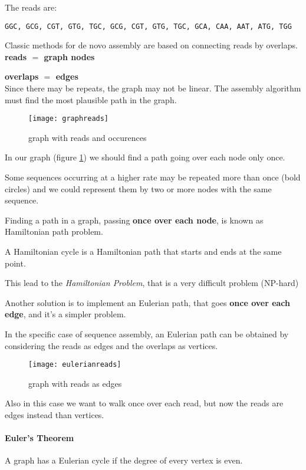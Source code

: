 The reads are:

\texttt{GGC, GCG, CGT, GTG, TGC, GCG, CGT, GTG, TGC, GCA, CAA, AAT, ATG, TGG}

Classic methods for de novo assembly are based on connecting reads by overlaps.\\
 
\textbf{reads $=$ graph nodes}
 
\textbf{overlaps $=$ edges}\\

Since there may be repeats, the graph may not be linear. 
The assembly algorithm must find the most plausible path in the graph.

\begin{figure}[H]
  \centering
  \texttt{[image: graphreads]}
  \caption{graph with reads and occurences}
  \label{fig:graphreads}
\end{figure}

In our graph (figure \ref{fig:graphreads}) we should find a path 
going over each node only once.

Some sequences occurring at a higher rate may be repeated more 
than once (bold circles) and we could represent them by two or more nodes
with the same sequence. 

Finding a path in a graph, passing \textbf{once over each node}, is known as
Hamiltonian path problem.

A Hamiltonian cycle is a Hamiltonian path that starts and ends at the same point.

This lead to the \textit{Hamiltonian Problem}, that is a
very difficult problem (NP-hard)

Another solution is to implement an Eulerian path, that goes
\textbf{once over each edge}, and it's a simpler problem.

In the specific case of sequence assembly, an  Eulerian path can be
obtained by considering the reads as edges and the overlaps as vertices.

\begin{figure}[H]
  \centering
  \texttt{[image: eulerianreads]}
  \caption{graph with reads as edges}
  \label{fig:eulerianreads}
\end{figure}

Also in this case we want to walk once over each read, but 
now the reads are edges instead than vertices.

\paragraph*{Euler's Theorem} A graph has a Eulerian cycle if the degree of every
vertex is even.

